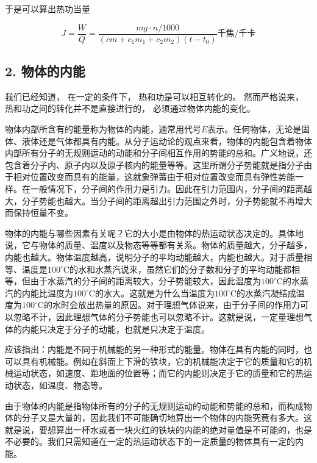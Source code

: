 于是可以算出热功当量

\[
J = \frac {W}{Q} = \frac {m g \cdot n / 1000}{(c m + c _ {1} m _ {1} + c _ {2} m _ {2}) (t - t _ {0})} \text{千焦/千卡}
\]

\subsection{2. 物体的内能}\label{ux7269ux4f53ux7684ux5185ux80fd}

我们已经知道， 在一定的条件下， 热和功是可以相互转化的。 然而严格说来，
热和功之间的转化并不是直接进行的， 必须通过物体内能的变化。

物体内部所含有的能量称为物体的内能，通常用代号\(E\)表示。任何物体，无论是固体、液体还是气体都具有内能。从分子运动论的观点来看，物体的内能包含着物体内部所有分子的无规则运动的动能和分子间相互作用的势能的总和。广义地说，还包含着分子内、原子内以及原子核内的能量等等。这里所谓分子势能就是指分子由于相对位置改变而具有的能量，这就象弹簧由于相对位置改变而具有弹性势能一样。在一般情况下，分子间的作用力是引力。因此在引力范围内，分子间的距离越大，分子势能也越大。当分子间的距离超出引力范围之外时，分子势能就不再增大而保持恒量不变。

物体的内能与哪些因素有关呢？它的大小是由物体的热运动状态决定的。具体地说，它与物体的质量、温度以及物态等等都有关系。物体的质量越大，分子越多，内能也越大。物体温度越高，说明分子的平均动能越大，内能也越大。对于质量相等、温度是\(100^{\circ}\mathrm{C}\)的水和水蒸汽说来，虽然它们的分子数和分子的平均动能都相等，但由于水蒸汽的分子间的距离较大，分子势能较大，因此温度为\(100^{\circ}\mathrm{C}\)的水蒸汽的内能比温度为\(100^{\circ}\mathrm{C}\)的水大。这就是为什么当温度为\(100^{\circ}\mathrm{C}\)的水蒸汽凝结成温度为\(100^{\circ}\mathrm{C}\)的水时会放出热量的原因。对于理想气体说来，由于分子间的作用力可以忽略不计，因此理想气体的分子势能也可以忽略不计。这就是说，一定量理想气体的内能只决定于分子的动能，也就是只决定于温度。

应该指出：内能是不同于机械能的另一种形式的能量。物体在具有内能的同时，也可以具有机械能。例如在斜面上下滑的铁块，它的机械能决定于它的质量和它的机械运动状态，如速度、距地面的位置等；而它的内能则决定于它的质量和它的热运动状态，如温度、物态等。

由于物体的内能是指物体所有的分子的无规则运动的动能和势能的总和，而构成物体的分子又是大量的，因此我们不可能确切地算出一个物体的内能究竟有多大。这就是说，要想算出一杯水或者一块火红的铁块的内能的绝对量值是不可能的，也是不必要的。我们只需知道在一定的热运动状态下的一定质量的物体具有一定的内能。

